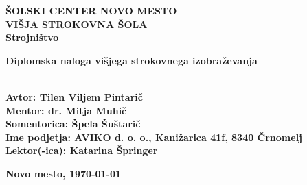 \begin{titlepage}
	\begin{center}
		\textbf{\fontsize{20}{40}\selectfont
			ŠOLSKI CENTER NOVO MESTO\\
			VIŠJA STROKOVNA ŠOLA\\
			Strojništvo\\
		}
		
		\vspace*{4cm}
		\textbf{\fontsize{18}{27}\selectfont
			Diplomska naloga višjega strokovnega izobraževanja\\
			\fontsize{26}{39}\selectfont \MakeUppercase{\thetitle}\\
		}
		
	\end{center}
	
	\vfill
	
	\textbf{\fontsize{14}{21}\selectfont
		Avtor: Tilen Viljem Pintarič \\
		Mentor: dr. Mitja Muhič \\
		Somentorica: Špela Šuštarič \\
		Ime podjetja: AVIKO d. o. o., Kanižarica 41f, 8340 Črnomelj \\
		Lektor(-ica): Katarina Špringer
	}
	
	\textbf{\fontsize{14}{21}\selectfont
		\hfill
		Novo mesto,
		\monthyeardate\today
	}
\end{titlepage}